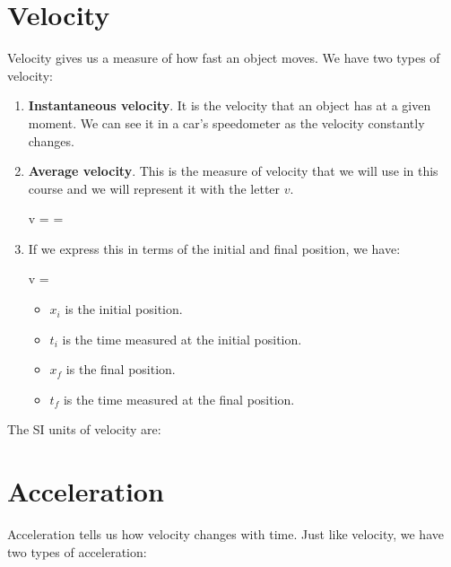 \section{Velocity}

Velocity gives us a measure of how fast an object moves.
We have two types of velocity:

\begin{enumerate}[label=\numberballmDarkTeal]
        \item \textbf{Instantaneous velocity}.
        It is the velocity that an object has at a given moment.
        We can see it in a car's speedometer as the velocity constantly changes.

        \item \textbf{Average velocity}.
        This is the measure of velocity that we will use in this course and we will represent it with the letter \( v \).
        \begin{centeredequation}
            v =  = 
        \end{centeredequation}

        \item If we express this in terms of the initial and final position, we have:
        \begin{centeredequation}
            v = 
        \end{centeredequation}
        \begin{itemize}
            \item \( x_i \) is the initial position.
            \item \( t_i \) is the time measured at the initial position.
            \item \( x_f \) is the final position.
            \item \( t_f \) is the time measured at the final position.
        \end{itemize}
\end{enumerate}

The SI units of velocity are: \unit{\mps}


\section{Acceleration}

Acceleration tells us how velocity changes with time.
Just like velocity, we have two types of acceleration:


